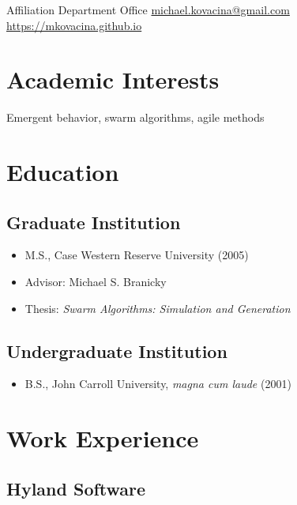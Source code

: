 \documentclass{cv_style}
\begin{document}

    \begin{center}  

    \contact
		{Affiliation}
		{Department}
		{Office}
		{\href{mailto:michael.kovacina@gmail.com}{michael.kovacina@gmail.com}}
		{\href{https://mkovacina.github.io}{https://mkovacina.github.io}}

	\end{center}
	
	\section{Academic Interests}
	Emergent behavior, swarm algorithms, agile methods

	\section{Education}
		\subsection{Graduate Institution}
				\begin{itemize}
					\item M.S., Case Western Reserve University (2005)
					\item Advisor: Michael S. Branicky
					\item Thesis: {\em Swarm Algorithms: Simulation and Generation}
				\end{itemize}
				
		\subsection{Undergraduate Institution}
				\begin{itemize}
					\item B.S., John Carroll University, \textit{magna cum laude} (2001)
				\end{itemize}
		
	\section{Work Experience}
		\subsection{Hyland Software}
\end{document}
